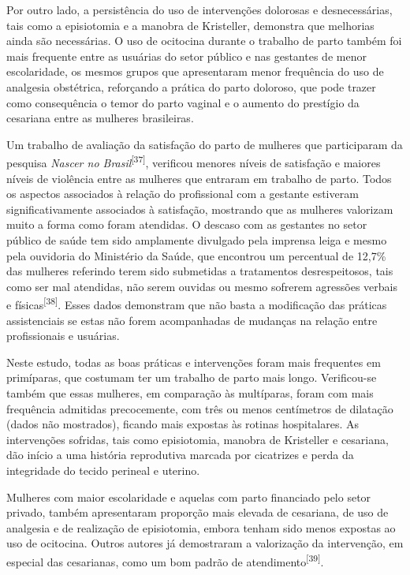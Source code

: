 \documentclass{article}
\begin{document}
Por outro lado, a persistência do uso de intervenções dolorosas e
desnecessárias,
tais como a episiotomia e a manobra de Kristeller, demonstra que melhorias ainda
são
necessárias. O uso de ocitocina durante o trabalho de parto também foi mais
frequente entre as usuárias do setor público e nas gestantes de menor
escolaridade,
os mesmos grupos que apresentaram menor frequência do uso de analgesia
obstétrica,
reforçando a prática do parto doloroso, que pode trazer como consequência o
temor do
parto vaginal e o aumento do prestígio da cesariana entre as mulheres
brasileiras.

Um trabalho de avaliação da satisfação do parto de mulheres que participaram da
pesquisa \textit{Nascer no Brasil}\textsuperscript{[}\textsuperscript{37}\textsuperscript{]}, verificou menores níveis de
satisfação e maiores níveis de violência entre as mulheres que entraram em
trabalho
de parto. Todos os aspectos associados à relação do profissional com a gestante
estiveram significativamente associados à satisfação, mostrando que as mulheres
valorizam muito a forma como foram atendidas. O descaso com as gestantes no
setor
público de saúde tem sido amplamente divulgado pela imprensa leiga e mesmo pela
ouvidoria do Ministério da Saúde, que encontrou um percentual de 12,7\% das
mulheres
referindo terem sido submetidas a tratamentos desrespeitosos, tais como ser mal
atendidas, não serem ouvidas ou mesmo sofrerem agressões verbais e físicas\textsuperscript{[}\textsuperscript{38}\textsuperscript{]}. Esses dados demonstram que não
basta a modificação das práticas assistenciais se estas não forem acompanhadas
de
mudanças na relação entre profissionais e usuárias.

Neste estudo, todas as boas práticas e intervenções foram mais frequentes em
primíparas, que costumam ter um trabalho de parto mais longo. Verificou-se
também
que essas mulheres, em comparação às multíparas, foram com mais frequência
admitidas
precocemente, com três ou menos centímetros de dilatação (dados não mostrados),
ficando mais expostas às rotinas hospitalares. As intervenções sofridas, tais
como
episiotomia, manobra de Kristeller e cesariana, dão início a uma história
reprodutiva marcada por cicatrizes e perda da integridade do tecido perineal e
uterino.

Mulheres com maior escolaridade e aquelas com parto financiado pelo setor
privado,
também apresentaram proporção mais elevada de cesariana, de uso de analgesia e
de
realização de episiotomia, embora tenham sido menos expostas ao uso de
ocitocina.
Outros autores já demostraram a valorização da intervenção, em especial das
cesarianas, como um bom padrão de atendimento\textsuperscript{[}\textsuperscript{39}\textsuperscript{]}.
\end{document}

